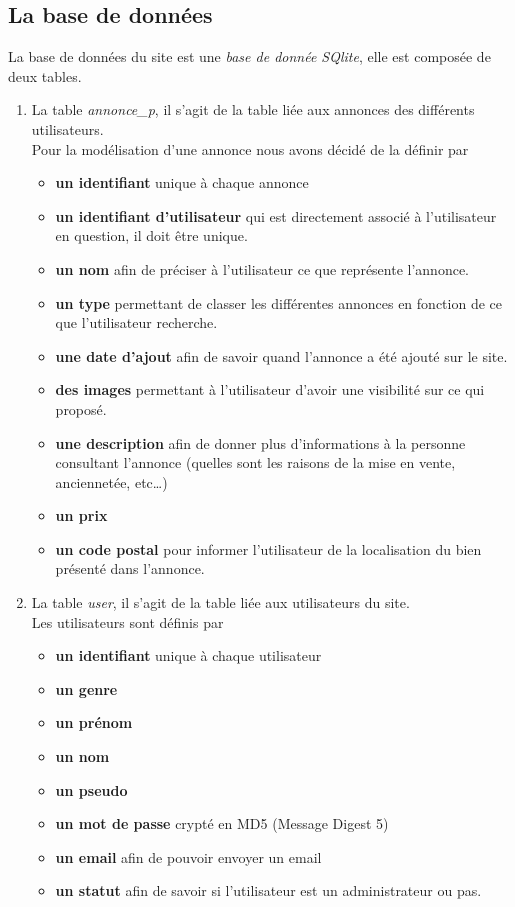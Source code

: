 \documentclass[11pt,a4paper]{article}
\begin{document}
\subsection{La base de données}
La base de données du site est une \emph{base de donnée SQlite}, elle est composée de deux tables.
\begin{enumerate}
    \item La table \emph{annonce\_p}, il s'agit de la table liée aux annonces des différents utilisateurs.\\
    Pour la modélisation d'une annonce nous avons décidé de la définir par
    \begin{itemize}
        \item \textbf{un identifiant} unique à chaque annonce
        \item \textbf{un identifiant d'utilisateur} qui est directement associé à l'utilisateur en question, il doit être unique.
        \item \textbf{un nom} afin de préciser à l'utilisateur ce que représente l'annonce.
        \item \textbf{un type} permettant de classer les différentes annonces en fonction de ce que l'utilisateur recherche.
        \item \textbf{une date d'ajout} afin de savoir quand l'annonce a été ajouté sur le site.
        \item \textbf{des images} permettant à l'utilisateur d'avoir une visibilité sur ce qui proposé.
        \item \textbf{une description} afin de donner plus d'informations à la personne consultant l'annonce (quelles sont les raisons de la mise en vente, anciennetée, etc\dots)
        \item \textbf{un prix}
        \item \textbf{un code postal} pour informer l'utilisateur de la localisation du bien présenté dans l'annonce.
    \end{itemize}
    \item La table \emph{user}, il s'agit de la table liée aux utilisateurs du site.\\
    Les utilisateurs sont définis par 
    \begin{itemize}
        \item \textbf{un identifiant} unique à chaque utilisateur
        \item \textbf{un genre} 
        \item \textbf{un prénom}
        \item \textbf{un nom} 
        \item \textbf{un pseudo}
        \item \textbf{un mot de passe} crypté en MD5 (Message Digest 5)
        \item \textbf{un email} afin de pouvoir envoyer un email
        \item \textbf{un statut} afin de savoir si l'utilisateur est un administrateur ou pas.
    \end{itemize}
\end{enumerate}
\end{document}
